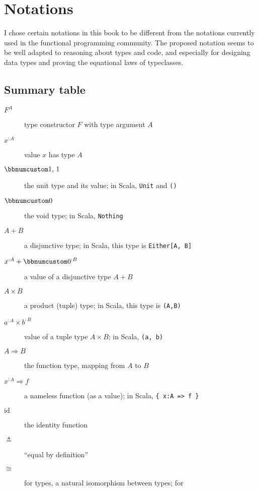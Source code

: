 
\appendix

\chapter{Notations\label{chap:Appendix-Notations}}

I chose certain notations in this book to be different from the notations
currently used in the functional programming community. The proposed
notation seems to be well adapted to reasoning about types and code,
and especially for designing data types and proving the equational
laws of typeclasses.

\section{Summary table}
\begin{description}
\item [{$F^{A}$}] type constructor $F$ with type argument $A$
\item [{$x^{:A}$}] value $x$ has type $A$
\item [{$\bbnum 1,\,1$}] the unit type and its value; in Scala, \lstinline!Unit!
and \lstinline!()!
\item [{$\bbnum 0$}] the void type; in Scala, \lstinline!Nothing!
\item [{$A+B$}] a disjunctive type; in Scala, this type is \lstinline!Either[A, B]! 
\item [{$x^{:A}+\bbnum 0^{:B}$}] a value of a disjunctive type $A+B$
\item [{$A\times B$}] a product (tuple) type; in Scala, this type is \lstinline!(A,B)!
\item [{$a^{:A}\times b^{:B}$}] value of a tuple type $A\times B$; in
Scala, \lstinline!(a, b)!
\item [{$A\Rightarrow B$}] the function type, mapping from $A$ to $B$
\item [{$x^{:A}\Rightarrow f$}] a nameless function (as a value); in Scala,
\lstinline!{ x:A => f }!
\item [{$\text{id}$}] the identity function
\item [{$\triangleq$}] ``equal by definition''
\item [{$\cong$}] for types, a natural isomorphism between types; for

\end{description}
